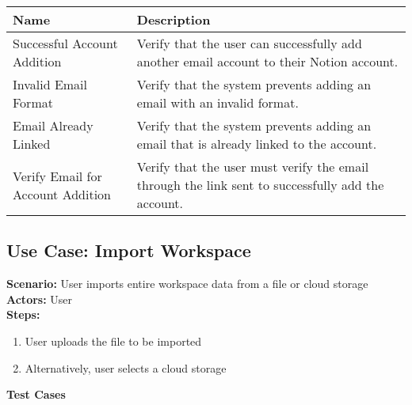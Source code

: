 \documentclass{article}
\begin{document}
            \begin{longtable}{|p{}|p{}|}
            \hline
            \textbf{Name} & \textbf{Description} \\
            \hline
            Successful Account Addition & Verify that the user can successfully add another email account to their Notion account. \\
\hline
Invalid Email Format & Verify that the system prevents adding an email with an invalid format. \\
\hline
Email Already Linked & Verify that the system prevents adding an email that is already linked to the account. \\
\hline
Verify Email for Account Addition & Verify that the user must verify the email through the link sent to successfully add the account. \\
\hline
\end{longtable}\subsection{\textbf{Use Case: Import Workspace}}
\textbf{Scenario:} User imports entire workspace data from a file or cloud storage\\
\textbf{Actors:} User\\
\textbf{Steps:}
\begin{enumerate}
\item User uploads the file to be imported
\item Alternatively, user selects a cloud storage
\end{enumerate}
\textbf{Test Cases}
\end{document}
